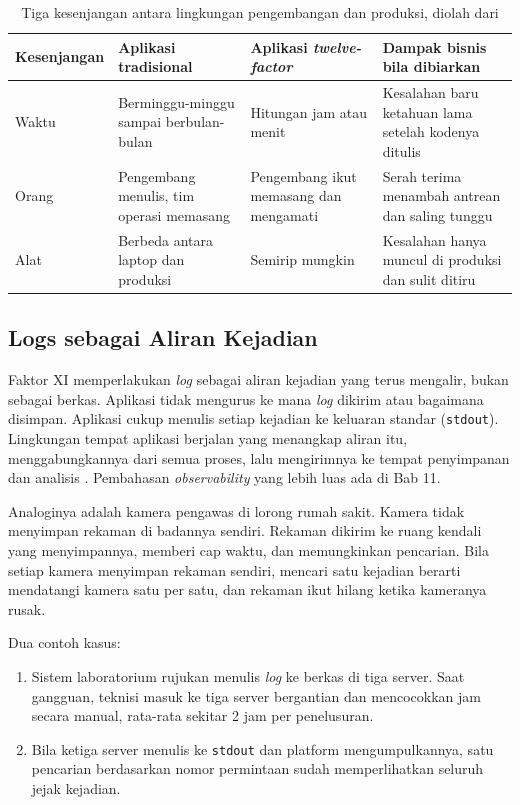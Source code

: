 \begin{table}[!htb]
  \centering
  \footnotesize
  \caption{Tiga kesenjangan antara lingkungan pengembangan dan produksi, diolah dari
           \cite{twelvefactor}}
  \label{tab:ch05-kesenjangan-lingkungan}
  \begin{tabularx}{\textwidth}{>{\raggedright\arraybackslash}p{1.8cm}
    >{\raggedright\arraybackslash}X >{\raggedright\arraybackslash}X
    >{\raggedright\arraybackslash}X}
    \hline
    \textbf{Kesenjangan} & \textbf{Aplikasi tradisional} & \textbf{Aplikasi
      \textit{twelve-factor}} & \textbf{Dampak bisnis bila dibiarkan} \\
    \hline
    Waktu & Berminggu-minggu sampai berbulan-bulan & Hitungan jam atau menit & Kesalahan
      baru ketahuan lama setelah kodenya ditulis \\
    \hline
    Orang & Pengembang menulis, tim operasi memasang & Pengembang ikut memasang dan
      mengamati & Serah terima menambah antrean dan saling tunggu \\
    \hline
    Alat & Berbeda antara laptop dan produksi & Semirip mungkin & Kesalahan hanya muncul di
      produksi dan sulit ditiru \\
    \hline
  \end{tabularx}
\end{table}

\subsection{Logs sebagai Aliran Kejadian}

Faktor XI memperlakukan \textit{log} sebagai aliran kejadian yang terus mengalir, bukan
sebagai berkas. Aplikasi tidak mengurus ke mana \textit{log} dikirim atau bagaimana
disimpan. Aplikasi cukup menulis setiap kejadian ke keluaran standar (\texttt{stdout}).
Lingkungan tempat aplikasi berjalan yang menangkap aliran itu, menggabungkannya dari semua
proses, lalu mengirimnya ke tempat penyimpanan dan analisis \cite{twelvefactor}. Pembahasan
\textit{observability} yang lebih luas ada di Bab 11.

Analoginya adalah kamera pengawas di lorong rumah sakit. Kamera tidak menyimpan rekaman di
badannya sendiri. Rekaman dikirim ke ruang kendali yang menyimpannya, memberi cap waktu, dan
memungkinkan pencarian. Bila setiap kamera menyimpan rekaman sendiri, mencari satu kejadian
berarti mendatangi kamera satu per satu, dan rekaman ikut hilang ketika kameranya rusak.

Dua contoh kasus:
\begin{enumerate}
  \item Sistem laboratorium rujukan menulis \textit{log} ke berkas di tiga server. Saat
        gangguan, teknisi masuk ke tiga server bergantian dan mencocokkan jam secara
        manual, rata-rata sekitar 2 jam per penelusuran.
  \item Bila ketiga server menulis ke \texttt{stdout} dan platform mengumpulkannya, satu
        pencarian berdasarkan nomor permintaan sudah memperlihatkan seluruh jejak kejadian.
\end{enumerate}

